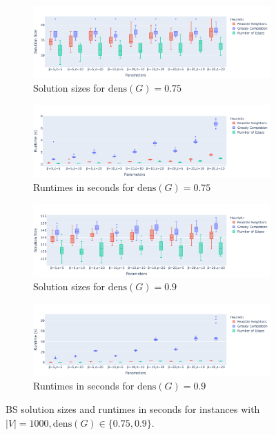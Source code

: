 \documentclass[draft,final]{vutinfth} %
\begin{document}
\begin{figure}
    \centering
    \begin{subfigure}{0.94\textwidth}
        \centering
        \includegraphics[width=\textwidth]{graphics/lbh-075-1000-size.pdf}
        \caption{Solution sizes for $\mathrm{dens}(G)=0.75$}
    \end{subfigure}
    \begin{subfigure}{0.94\textwidth}
        \centering
        \includegraphics[width=\textwidth]{graphics/lbh-075-1000-runtime.pdf}
        \caption{Runtimes in seconds for $\mathrm{dens}(G)=0.75$}
    \end{subfigure}
    \centering
    \begin{subfigure}{0.94\textwidth}
        \centering
        \includegraphics[width=\textwidth]{graphics/lbh-09-1000-size.pdf}
        \caption{Solution sizes for $\mathrm{dens}(G)=0.9$}
    \end{subfigure}
    \begin{subfigure}{0.94\textwidth}
        \centering
        \includegraphics[width=\textwidth]{graphics/lbh-09-1000-runtime.pdf}
        \caption{Runtimes in seconds for $\mathrm{dens}(G)=0.9$}
    \end{subfigure}
    \caption{BS solution sizes and runtimes in seconds for instances with $|V|=1000, \mathrm{dens}(G) \in \{0.75, 0.9\}$.}
    \label{fig:bs-heuristics-random-2}
\end{figure}
\end{document}
